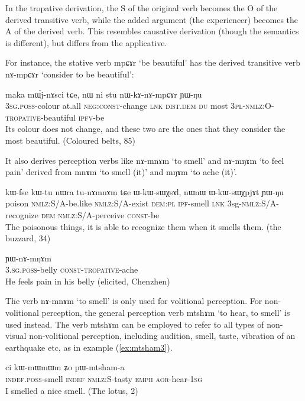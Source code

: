 \documentclass[oldfontcommands,twoside,a4paper,12pt]{article}
\newcommand{\ipa}[1]{{\phon \mbox{#1}}} %
\newcommand{\const}{\textsc{const}}
\newcommand{\dem}{\textsc{dem}}
\newcommand{\distal}{\textsc{dist}}
\newcommand{\du}{\textsc{du}}
\newcommand{\ipf}{\textsc{ipfv}}
\newcommand{\negat}{\textsc{neg}}
\newcommand{\nmlz}{\textsc{nmlz}}
\newcommand{\pl}{\textsc{pl}}
\newcommand{\poss}{\textsc{poss}}
\newcommand{\sg}{\textsc{sg}}
\begin{document}
In the tropative derivation,  the S of the original verb becomes the O of the derived transitive verb, while the added argument (the experiencer) becomes the A of the derived verb. This resembles  causative derivation (though the semantics is different), but differs from the applicative.

For instance, the stative verb  \ipa{mpɕɤr} `be beautiful' has the derived transitive verb \ipa{nɤ-mpɕɤr} `consider to be beautiful':


 \begin{exe}
\ex
\gll  \ipa{ɯ-mdoʁ} 	\ipa{maka} 	\ipa{mɯ́j-nɤsci} 	\ipa{tɕe,} 	\ipa{nɯ} 	\ipa{ni} 	\ipa{stu} 	\ipa{nɯ-kɤ-nɤ-mpɕɤr} 	\ipa{ɲɯ-ŋu} 
\\
3\sg{}.\poss{}-colour at.all \negat{}:\const{}-change \textsc{lnk} \distal{}.\dem{} \du{} most 3\pl{}-\nmlz{}:O-\textsc{tropative}-beautiful \ipf{}-be \\
 \glt  Its colour does not change, and these two are the ones that they consider the most beautiful. (Coloured belts, 85)
\end{exe} 

It also derives perception verbs like \ipa{nɤ-mnɤm} `to smell' and \ipa{nɤ-mŋɤm} `to feel pain' derived from \ipa{mnɤm} `to smell (it)' and \ipa{mŋɤm} `to ache (it)'.  

 
 

  \begin{exe}
\ex \label{ex:namnam}
\gll \ipa{tɯɣ}  	\ipa{kɯ-fse}  	\ipa{kɯ-tu}  	\ipa{nɯra}  	\ipa{tu-nɤmnɤm}  	\ipa{tɕe}  	\ipa{ɯ-kɯ-sɯχsɤl,}  	\ipa{nɯnɯ}  	\ipa{ɯ-kɯ-sɯχpjɤt}  	\ipa{ɲɯ-ŋu}   \\
poison  \textsc{nmlz:S/A}-be.like  \textsc{nmlz:S/A}-exist \textsc{dem:pl} \textsc{ipf}-smell \textsc{lnk} 3sg-\textsc{nmlz:S/A}-recognize \textsc{dem} \textsc{nmlz:S/A}-perceive \textsc{const}-be \\
\glt The poisonous things, it is able to recognize them when it smells them. (the buzzard, 34)
\end{exe}


 \begin{exe}
\ex \label{ex:namNam2}
\gll  \ipa{ɯ-xtu} \ipa{ɲɯ-nɤ-mŋɤm}  \\
\textsc{3.sg.poss}-belly \textsc{const}-\textsc{tropative}-ache \\
\glt  He feels pain in his belly (elicited, Chenzhen)
\end{exe}

The verb \ipa{nɤ-mnɤm} `to smell' is only used for volitional perception. For non-volitional perception,  the general  perception verb \ipa{mtshɤm} `to hear, to smell' is used instead. The verb \ipa{mtshɤm}  can be employed to refer to all types of non-visual non-volitional perception, including audition, smell, taste, vibration of an earthquake etc, as in example (\ref{ex:mtsham3}).
 \begin{exe}
\ex \label{ex:mtsham3}
\gll \ipa{tɤ-di}   	\ipa{ci}   	\ipa{kɯ-mɯmɯm}   	\ipa{ʑo}   	\ipa{pɯ-mtsham-a}   	 \\
\textsc{indef.poss}-smell \textsc{indef} \textsc{nmlz:S}-tasty \textsc{emph} \textsc{aor-}hear-\textsc{1sg} \\
 \glt I smelled a nice smell. (The lotus, 2)
\end{exe} 
\end{document}
